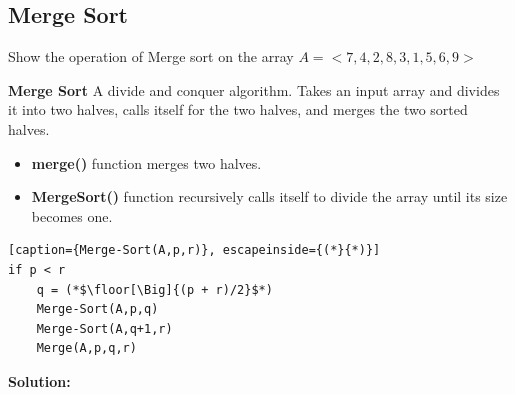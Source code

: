 \documentclass[11pt,fleqn]{book}
\DeclarePairedDelimiter{\floor}{\lfloor}{\rfloor}
\begin{document}
\subsection{Merge Sort}
\begin{example}
Show the operation of Merge sort on the array  $A= <7,4,2,8,3,1,5,6,9>$
\end{example}
\begin{definition}
\textbf{Merge Sort} A divide and conquer algorithm. Takes an input array and divides it into two halves, calls itself for the two halves, and merges the two sorted halves. 
\begin{itemize}
    \item \textbf{merge()} function merges two halves. 
    \item \textbf{MergeSort()} function recursively calls itself to divide the array until its size becomes one. 
\end{itemize}
\end{definition}
\begin{lstlisting}[caption={Merge-Sort(A,p,r)}, escapeinside={(*}{*)}]
if p < r 
    q = (*$\floor[\Big]{(p + r)/2}$*)
    Merge-Sort(A,p,q)
    Merge-Sort(A,q+1,r)
    Merge(A,p,q,r)
\end{lstlisting}
\vspace{1em} 
\textbf{Solution:} 

\end{document}
